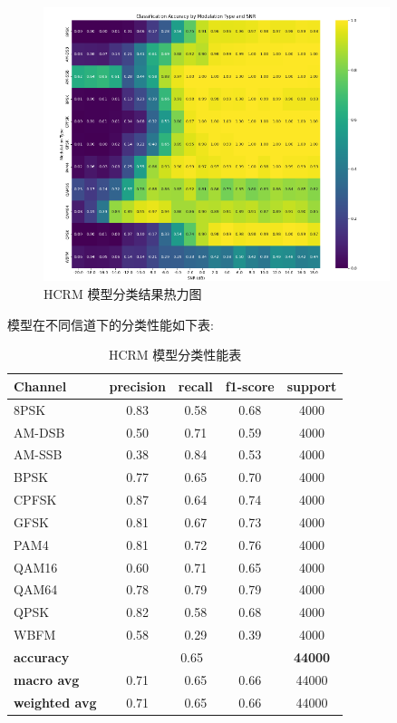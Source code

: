 \documentclass{article}
\begin{document}
\begin{CJK}{UTF8}{gbsn}
\begin{figure}[H]
    \centering
    \includegraphics[width=0.9\textwidth]{figure/image11.png}
    \caption{HCRM 模型分类结果热力图}
    \label{fig:hcrm_heatmap}
\end{figure}

模型在不同信道下的分类性能如下表:

\begin{table}[H]
    \centering
    \caption{HCRM 模型分类性能表}
    \begin{tabular}{|l|c|c|c|c|}
        \hline
        \textbf{Channel} & \textbf{precision} & \textbf{recall} & \textbf{f1-score} & \textbf{support} \\
        \hline
        8PSK & 0.83 & 0.58 & 0.68 & 4000 \\
        AM-DSB & 0.50 & 0.71 & 0.59 & 4000 \\
        AM-SSB & 0.38 & 0.84 & 0.53 & 4000 \\
        BPSK & 0.77 & 0.65 & 0.70 & 4000 \\
        CPFSK & 0.87 & 0.64 & 0.74 & 4000 \\
        GFSK & 0.81 & 0.67 & 0.73 & 4000 \\
        PAM4 & 0.81 & 0.72 & 0.76 & 4000 \\
        QAM16 & 0.60 & 0.71 & 0.65 & 4000 \\
        QAM64 & 0.78 & 0.79 & 0.79 & 4000 \\
        QPSK & 0.82 & 0.58 & 0.68 & 4000 \\
        WBFM & 0.58 & 0.29 & 0.39 & 4000 \\
        \hline
        \textbf{accuracy} & \multicolumn{3}{|c|}{0.65} & \textbf{44000} \\
        \hline
        \textbf{macro avg} & 0.71 & 0.65 & 0.66 & 44000 \\
        \hline
        \textbf{weighted avg} & 0.71 & 0.65 & 0.66 & 44000 \\
        \hline
    \end{tabular}
    \label{tab:hcrm_performance}
\end{table}


\end{CJK}
\end{document}
